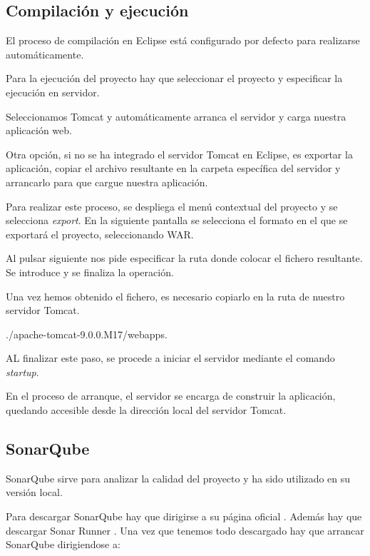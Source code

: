 \subsection{Compilación y ejecución}

El proceso de compilación en Eclipse está configurado por defecto para realizarse automáticamente.

Para la ejecución del proyecto hay que seleccionar el proyecto y especificar la ejecución en servidor.


Seleccionamos Tomcat y automáticamente arranca el servidor y carga nuestra aplicación web.

Otra opción, si no se ha integrado el servidor Tomcat en Eclipse, es exportar la aplicación, copiar el archivo resultante en la carpeta específica del servidor y arrancarlo para que cargue nuestra aplicación.

Para realizar este proceso, se despliega el menú contextual del proyecto y se selecciona \emph{export}. En la siguiente pantalla se selecciona el formato en el que se exportará el proyecto, seleccionando WAR.


Al pulsar siguiente nos pide especificar la ruta donde colocar el fichero resultante. Se introduce y se finaliza la operación.


Una vez hemos obtenido el fichero, es necesario copiarlo en la ruta de nuestro servidor Tomcat.

./apache-tomcat-9.0.0.M17/webapps.

AL finalizar este paso, se procede a iniciar el servidor mediante el comando \emph{startup}.


En el proceso de arranque, el servidor se encarga de construir la aplicación, quedando accesible desde la dirección local del servidor Tomcat.

\subsection{SonarQube}

SonarQube sirve para analizar la calidad del proyecto y ha sido utilizado en su versión local.

Para descargar SonarQube hay que dirigirse a su página oficial \cite{down:sonq}. Además hay que descargar Sonar Runner \cite{down:sonr}. Una vez que tenemos todo descargado hay que arrancar SonarQube dirigiendose a:

